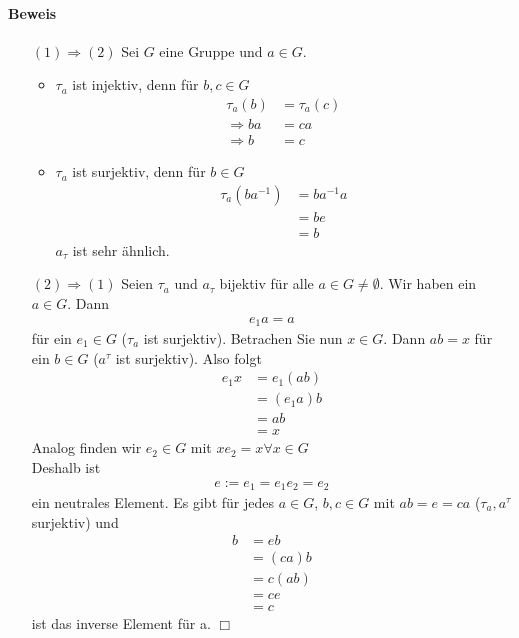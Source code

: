 \documentclass[11pt]{report}
\begin{document}
\paragraph{Beweis}

\begin{itemize}
\item[$(1)\Rightarrow(2)$] Sei $G$ eine Gruppe und $a \in G$.
\begin{itemize}
 \item $\tau_a$ ist injektiv, denn für $b, c \in G$
\begin{align}
\tau_a(b) &= \tau_a(c) \\
\Rightarrow ba &= ca \\
\Rightarrow b &= c
\end{align}
\item $\tau_a$ ist surjektiv, denn für $b \in G$
\begin{align}
 \tau_a(ba^{-1}) &= ba^{-1}a \\
                 &= be \\
                 &= b
\end{align}
$a_{\tau}$ ist sehr ähnlich.
\end{itemize}

\item[$(2)\Rightarrow(1)$] Seien $\tau_a$ und $a_{\tau}$ bijektiv für alle $a \in G \neq \emptyset$.
Wir haben ein $a \in G$. Dann 
\begin{align}
 e_1a = a
\end{align}
für ein $e_1\in G$ ($\tau_a$ ist surjektiv).
Betrachen Sie nun $x \in G$. Dann $ab = x$ für ein $b \in G$ ($a^{\tau}$ ist surjektiv).
Also folgt
\begin{align}
 e_1x &= e_1(ab) \\
      &= (e_1a)b \\
      &= ab \\
      &= x
\end{align}
Analog finden wir 
$e_2 \in G$ mit $xe_2 = x \forall x \in G$\\
Deshalb ist
\begin{align} 
e:=e_1=e_1e_2=e_2
\end{align}
ein neutrales Element.
Es gibt für jedes $a \in G$, $b, c \in G$ mit $ab=e=ca$ ($\tau_a, a^{\tau}$ surjektiv) und
\begin{align}
 b &= eb \\
   &= (ca)b \\
   &= c(ab) \\
   &= ce \\
   &= c
\end{align}
ist das inverse Element für a. \hfill $\Box$
\end{itemize}
\end{document}
